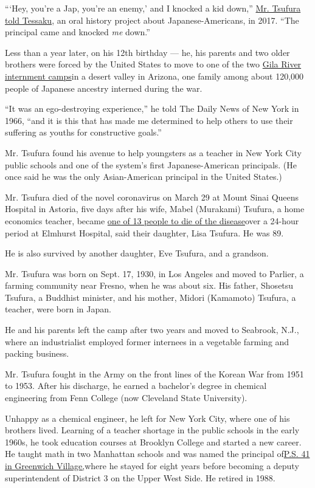 ```Hey, you're a Jap, you're an enemy,' and I knocked a kid down,''
\href{https://www.tessaku.com/oral-histories//2017/03/15/tadashi-tsufura}{Mr.
Tsufura told Tessaku}, an oral history project about Japanese-Americans,
in 2017. ``The principal came and knocked \emph{me} down.''

Less than a year later, on his 12th birthday --- he, his parents and two
older brothers were forced by the United States to move to one of the
two \href{https://encyclopedia.densho.org/Gila_River/}{Gila River
internment camps}in a desert valley in Arizona, one family among about
120,000 people of Japanese ancestry interned during the war.

``It was an ego-destroying experience,'' he told The Daily News of New
York in 1966, ``and it is this that has made me determined to help
others to use their suffering as youths for constructive goals.''

Mr. Tsufura found his avenue to help youngsters as a teacher in New York
City public schools and one of the system's first Japanese-American
principals. (He once said he was the only Asian-American principal in
the United States.)

Mr. Tsufura died of the novel coronavirus on March 29 at Mount Sinai
Queens Hospital in Astoria, five days after his wife, Mabel (Murakami)
Tsufura, a home economics teacher, became
\href{https://www.nytimes.com/2020/03/25/nyregion/nyc-coronavirus-hospitals.html}{one
of 13 people to die of the disease}over a 24-hour period at Elmhurst
Hospital, said their daughter, Lisa Tsufura. He was 89.

He is also survived by another daughter, Eve Tsufura, and a grandson.

Mr. Tsufura was born on Sept. 17, 1930, in Los Angeles and moved to
Parlier, a farming community near Fresno, when he was about six. His
father, Shosetsu Tsufura, a Buddhist minister, and his mother, Midori
(Kamamoto) Tsufura, a teacher, were born in Japan.

He and his parents left the camp after two years and moved to Seabrook,
N.J., where an industrialist employed former internees in a vegetable
farming and packing business.

Mr. Tsufura fought in the Army on the front lines of the Korean War from
1951 to 1953. After his discharge, he earned a bachelor's degree in
chemical engineering from Fenn College (now Cleveland State University).

Unhappy as a chemical engineer, he left for New York City, where one of
his brothers lived. Learning of a teacher shortage in the public schools
in the early 1960s, he took education courses at Brooklyn College and
started a new career. He taught math in two Manhattan schools and was
named the principal of\href{https://www.ps41.org/}{P.S. 41 in Greenwich
Village,}where he stayed for eight years before becoming a deputy
superintendent of District 3 on the Upper West Side. He retired in 1988.

